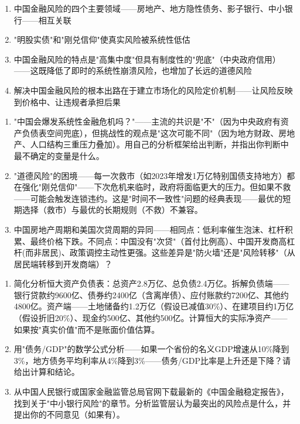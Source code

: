 \documentclass[a4paper,11pt]{ctexbook}
\begin{document}
\begin{lessonsummary}
\begin{enumerate}
  \item 中国金融风险的四个主要领域——房地产、地方隐性债务、影子银行、中小银行——相互关联
  \item "明股实债"和"刚兑信仰"使真实风险被系统性低估
  \item 中国金融风险的特点是"高集中度"但具有制度性的"兜底"（中央政府信用）——这既降低了即时的系统性崩溃风险，也增加了长远的道德风险
  \item 解决中国金融风险的根本出路在于建立市场化的风险定价机制——让风险反映到价格中、让违规者承担后果
\end{enumerate}
\end{lessonsummary}

\begin{discuss}
\begin{enumerate}
  \item "中国会爆发系统性金融危机吗？"——主流的共识是"不"（因为中央政府有资产负债表空间兜底），但挑战性的观点是"这次可能不同"（因为地方财政、房地产、人口结构三重压力叠加）。用自己的分析框架给出判断，并指出你判断中最不确定的变量是什么。
  \item "道德风险"的困境——每一次救市（如2023年增发1万亿特别国债支持地方）都在强化"刚兑信仰"——下次危机来临时，政府将面临更大的压力。但如果不救——可能会触发连锁违约。这是"时间不一致性"问题的经典表现——最优的短期选择（救市）与最优的长期规则（不救）不兼容。
  \item 中国房地产周期和美国次贷周期的异同——相同点：低利率催生泡沫、杠杆积累、最终价格下跌。不同点：中国没有"次贷"（首付比例高）、中国开发商高杠杆(而非居民)、政策调控主动性更强。这些差异是"防火墙"还是"风险转移"（从居民端转移到开发商端）？
\end{enumerate}
\end{discuss}

\begin{exercises}
\begin{enumerate}
  \item 简化分析恒大资产负债表：总资产2.8万亿、总负债2.4万亿。拆解负债端——银行贷款约9600亿、债券约2400亿（含离岸债）、应付账款约7200亿、其他约4800亿。资产端——土地储备约1.2万亿（假设已减值30\%）、在建项目约1万亿（假设折旧20\%）、现金约500亿、其他约500亿。计算恒大的实际净资产——如果按"真实价值"而不是账面价值估算。
  \item 用"债务/GDP"的数学公式分析——如果一个省份的名义GDP增速从10\%降到3\%，地方债务平均利率从4\%降到3\%——债务/GDP比率是上升还是下降？请给出计算和结论。
  \item 从中国人民银行或国家金融监管总局官网下载最新的《中国金融稳定报告》，找到关于"中小银行风险"的章节。分析监管层认为最突出的风险点是什么，并提出你的不同意见（如果有）。
\end{enumerate}
\end{exercises}
\end{document}
